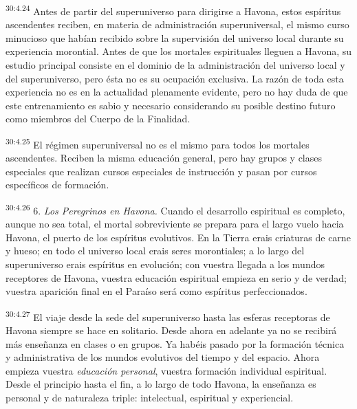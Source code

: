 \par
\textsuperscript{30:4.24} Antes de partir del superuniverso para dirigirse a Havona, estos espíritus ascendentes reciben, en materia de administración superuniversal, el mismo curso minucioso que habían recibido sobre la supervisión del universo local durante su experiencia morontial. Antes de que los mortales espirituales lleguen a Havona, su estudio principal consiste en el dominio de la administración del universo local y del superuniverso, pero ésta no es su ocupación exclusiva. La razón de toda esta experiencia no es en la actualidad plenamente evidente, pero no hay duda de que este entrenamiento es sabio y necesario considerando su posible destino futuro como miembros del Cuerpo de la Finalidad.

\par
\textsuperscript{30:4.25} El régimen superuniversal no es el mismo para todos los mortales ascendentes. Reciben la misma educación general, pero hay grupos y clases especiales que realizan cursos especiales de instrucción y pasan por cursos específicos de formación.

\par
\textsuperscript{30:4.26} 6. \textit{Los Peregrinos en Havona.} Cuando el desarrollo espiritual es completo, aunque no sea total, el mortal sobreviviente se prepara para el largo vuelo hacia Havona, el puerto de los espíritus evolutivos. En la Tierra erais criaturas de carne y hueso; en todo el universo local erais seres morontiales; a lo largo del superuniverso erais espíritus en evolución; con vuestra llegada a los mundos receptores de Havona, vuestra educación espiritual empieza en serio y de verdad; vuestra aparición final en el Paraíso será como espíritus perfeccionados.

\par
\textsuperscript{30:4.27} El viaje desde la sede del superuniverso hasta las esferas receptoras de Havona siempre se hace en solitario. Desde ahora en adelante ya no se recibirá más enseñanza en clases o en grupos. Ya habéis pasado por la formación técnica y administrativa de los mundos evolutivos del tiempo y del espacio. Ahora empieza vuestra \textit{educación personal}, vuestra formación individual espiritual. Desde el principio hasta el fin, a lo largo de todo Havona, la enseñanza es personal y de naturaleza triple: intelectual, espiritual y experiencial.

